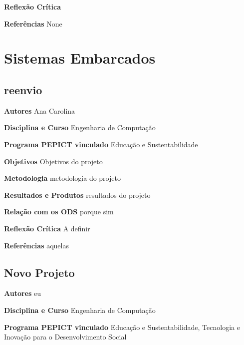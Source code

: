 \documentclass[12pt,openright,oneside,a4paper]{report}
\begin{document}
\vspace{0.7cm}
\noindent
\textbf{Reflexão Crítica}


\vspace{0.7cm}
\noindent
\textbf{Referências}
None

\vspace{0.7cm}
\chapter{Sistemas Embarcados}

\section{reenvio}
\noindent
\textbf{Autores}
Ana Carolina

\vspace{0.7cm}
\noindent
\textbf{Disciplina e Curso}
Engenharia de Computação

\vspace{0.7cm}
\noindent
\textbf{Programa PEPICT vinculado}
Educação e Sustentabilidade

\vspace{0.7cm}
\noindent
\textbf{Objetivos}
Objetivos do projeto

\vspace{0.7cm}
\noindent
\textbf{Metodologia}
metodologia do projeto

\vspace{0.7cm}
\noindent
\textbf{Resultados e Produtos}
resultados do projeto

\vspace{0.7cm}
\noindent
\textbf{Relação com os ODS}
porque sim

\vspace{0.7cm}
\noindent
\textbf{Reflexão Crítica}
A definir

\vspace{0.7cm}
\noindent
\textbf{Referências}
aquelas

\vspace{0.7cm}
\section{Novo Projeto}
\noindent
\textbf{Autores}
eu

\vspace{0.7cm}
\noindent
\textbf{Disciplina e Curso}
Engenharia de Computação

\vspace{0.7cm}
\noindent
\textbf{Programa PEPICT vinculado}
Educação e Sustentabilidade, Tecnologia e Inovação para o Desenvolvimento Social
\end{document}
